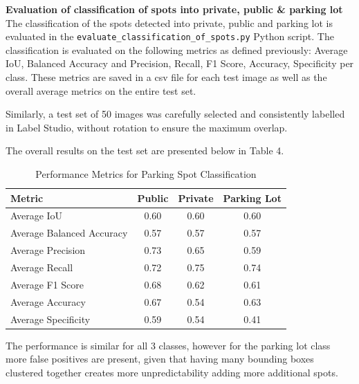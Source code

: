 \textbf{Evaluation of classification of spots into private, public \& parking lot}
The classification of the spots detected into private, public and parking lot is
evaluated in the \texttt{evaluate\_classification\_of\_spots.py} Python script.
The classification is evaluated on the following metrics as defined previously:
Average IoU, Balanced Accuracy and Precision, Recall, F1 Score, Accuracy,
Specificity per class. These metrics are saved in a csv file for each test image
as well as the overall average metrics on the entire test set.

Similarly, a test set of 50 images was carefully selected and consistently
labelled in Label Studio, without rotation to ensure the maximum overlap.

The overall results on the test set are presented below in Table 4.

\begin{table}[htbp]
  \centering
  \begin{tabular}{|l|c|c|c|}
    \hline
    \textbf{Metric}           & \textbf{Public} & \textbf{Private} & \textbf{Parking Lot} \\ \hline
    Average IoU               & 0.60            & 0.60             & 0.60                 \\ \hline
    Average Balanced Accuracy & 0.57            & 0.57             & 0.57                 \\ \hline
    Average Precision         & 0.73            & 0.65             & 0.59                 \\ \hline
    Average Recall            & 0.72            & 0.75             & 0.74                 \\ \hline
    Average F1 Score          & 0.68            & 0.62             & 0.61                 \\ \hline
    Average Accuracy          & 0.67            & 0.54             & 0.63                 \\ \hline
    Average Specificity       & 0.59            & 0.54             & 0.41                 \\ \hline
  \end{tabular}
  \caption{Performance Metrics for Parking Spot Classification}
  \label{tab:metrics3}
\end{table}

\newpage{}

The performance is similar for all 3 classes, however for the parking lot class
more false positives are present, given that having many bounding boxes
clustered together creates more unpredictability adding more additional spots.

